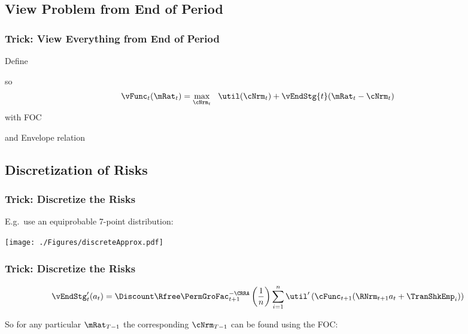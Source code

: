 \documentclass{beamer}
\begin{document}
\subsection{View Problem from End of Period}

\begin{frame}[label=Normalize]
\frametitle{Trick: View Everything from End of Period}

Define 

so 
\begin{equation}\begin{gathered}\begin{aligned}
  \vFunc_{t}(\mRat_{t})  & = \max_{\cNrm_{t}}~~ \util(\cNrm_{t}) + \vEndStg{t}(\mRat_{t}-\cNrm_{t})
\end{aligned}\end{gathered}\end{equation}
with FOC

and Envelope relation


\end{frame}


\subsection{Discretization of Risks}
\begin{frame}[label=DiscretizeFig]
\frametitle{Trick: Discretize the Risks}

E.g.\ use an equiprobable 7-point distribution:\medskip\medskip

\texttt{[image: ./Figures/discreteApprox.pdf]}

\end{frame}

\begin{frame}[label=DiscretizeEqn]
\frametitle{Trick: Discretize the Risks}

\begin{equation}\begin{gathered}\begin{aligned}
        \vEndStg_{t}^{\prime}(a_{t})  & =  \Discount \Rfree \PermGroFac_{t+1}^{-\CRRA} \left(\frac{1}{n}\right) \sum_{i=1}^{n} \util^{\prime}\left(\cFunc_{t+1}(\RNrm_{t+1} a_{t} + \TranShkEmp_{i})\right)
\end{aligned}\end{gathered}\end{equation}

%

\pause 
So for any particular $\mRat_{T-1}$ the corresponding $\cNrm_{T-1}$ can be found
using the FOC:



\end{frame}
\end{document}
